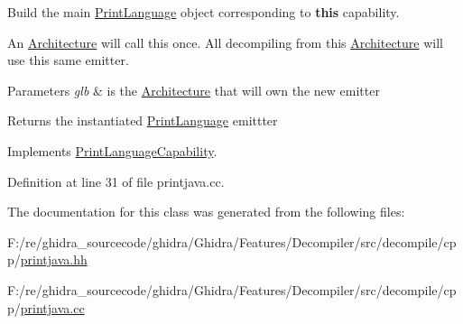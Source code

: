 Build the main \mbox{\hyperlink{class_print_language}{Print\+Language}} object corresponding to {\bfseries{this}} capability. 

An \mbox{\hyperlink{class_architecture}{Architecture}} will call this once. All decompiling from this \mbox{\hyperlink{class_architecture}{Architecture}} will use this same emitter. 
\begin{DoxyParams}{Parameters}
{\em glb} & is the \mbox{\hyperlink{class_architecture}{Architecture}} that will own the new emitter \\
\hline
\end{DoxyParams}
\begin{DoxyReturn}{Returns}
the instantiated \mbox{\hyperlink{class_print_language}{Print\+Language}} emittter 
\end{DoxyReturn}


Implements \mbox{\hyperlink{class_print_language_capability_a50e2abb3f0b4cf3ab67556f77eacc51e}{Print\+Language\+Capability}}.



Definition at line 31 of file printjava.\+cc.



The documentation for this class was generated from the following files\+:\begin{DoxyCompactItemize}
\item 
F\+:/re/ghidra\+\_\+sourcecode/ghidra/\+Ghidra/\+Features/\+Decompiler/src/decompile/cpp/\mbox{\hyperlink{printjava_8hh}{printjava.\+hh}}\item 
F\+:/re/ghidra\+\_\+sourcecode/ghidra/\+Ghidra/\+Features/\+Decompiler/src/decompile/cpp/\mbox{\hyperlink{printjava_8cc}{printjava.\+cc}}\end{DoxyCompactItemize}
